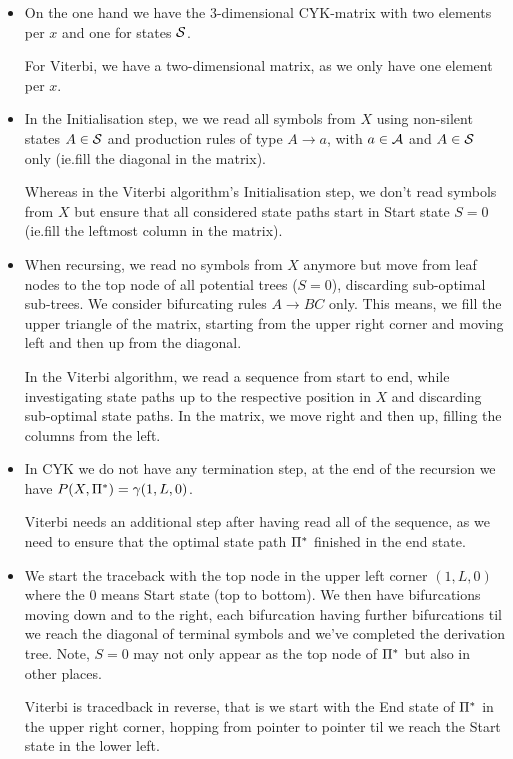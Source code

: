 \begin{itemize}
\item On the one hand we have the 3-dimensional CYK-matrix with two elements
  per \(x\) and one for states \(\mathcal{S}\).

  For Viterbi, we have a two-dimensional matrix, as we only have one element
  per \(x\).
\item In the Initialisation step, we we read all symbols from \(X\) using
  non-silent states \(A\in\mathcal{S}\) and production rules of type \(A\to a\),
  with \(a\in\mathcal{A}\) and \(A\in\mathcal{S}\) only (ie.\@ fill the diagonal in
  the matrix).

  Whereas in the Viterbi algorithm's Initialisation step, we don't read symbols
  from \(X\) but ensure that all considered state paths start in Start state
  \(S=0\) (ie.\@ fill the leftmost column in the matrix).
\item When recursing, we read no symbols from \(X\) anymore but move from leaf
  nodes to the top node of all potential trees (\(S=0\)), discarding sub-optimal
  sub-trees.  We consider bifurcating rules \(A\to BC\) only.  This means, we
  fill the upper triangle of the matrix, starting from the upper right corner
  and moving left and then up from the diagonal.

  In the Viterbi algorithm, we read a sequence from start to end, while
  investigating state paths up to the respective position in \(X\) and
  discarding sub-optimal state paths.  In the matrix, we move right and then
  up, filling the columns from the left.
\item In CYK we do not have any termination step, at the end of the recursion
  we have \(P(X,\Pi^*)=\gamma(1,L,0)\).

  Viterbi needs an additional step after having read all of the sequence, as we
  need to ensure that the optimal state path \(\Pi^*\) finished in the end
  state.
\item We start the traceback with the top node in the upper left corner
  \((1,L,0)\) where the \(0\) means Start state (top to bottom).  We then have
  bifurcations moving down and to the right, each bifurcation having further
  bifurcations til we reach the diagonal of terminal symbols and we've completed
  the derivation tree.  Note, \(S=0\) may not only appear as the top node of
  \(\Pi^*\) but also in other places.

  Viterbi is tracedback in reverse, that is we start with the End state of
  \(\Pi^*\) in the upper right corner, hopping from pointer to pointer til
  we reach the Start state in the lower left.
\end{itemize}

